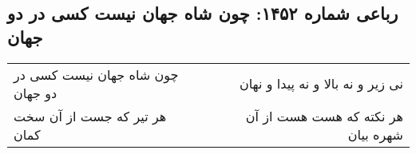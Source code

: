 \begin{center}
\section*{رباعی شماره ۱۴۵۲: چون شاه جهان نیست کسی در دو جهان}
\label{sec:1452}
\begin{longtable}{l p{0.5cm} r}
چون شاه جهان نیست کسی در دو جهان
&&
نی زیر و نه بالا و نه پیدا و نهان
\\
هر تیر که جست از آن سخت کمان
&&
هر نکته که هست هست از آن شهره بیان
\\
\end{longtable}
\end{center}
